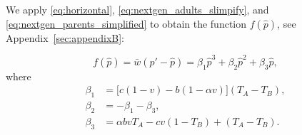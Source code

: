 \documentclass[12pt]{extarticle}
\begin{document}
{%
%

We apply \autoref{eq:horizontal}, \autoref{eq:nextgen_adults_slimpify}, and \autoref{eq:nextgen_parents_simplified} to obtain the function $f(\hat{p})$, see Appendix~\autoref{sec:appendixB}:

\begin{equation} \label{eq:general_case_polynomial}
  f(\hat{p}) = \bar{w}(\hat{p}'-\hat{p}) =
  \beta_1 \hat{p}^3 + \beta_2 \hat{p}^2 + \beta_3 \hat{p},
\end{equation}
where 
\begin{equation} \label{eq:polynomial_coefficients}
\begin{aligned}
\beta_1 &= \big[c(1-v) - b (1-\alpha v)\big] (T_A-T_B) , \\
\beta_2 &= -\beta_1 -\beta_3 ,  \\
\beta_3 &= \alpha bvT_A - cv(1-T_B) + (T_A-T_B) .
\end{aligned}
\end{equation}

}
\end{document}
